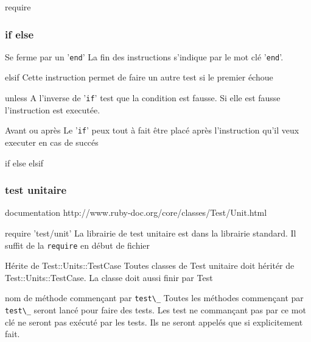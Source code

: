 \documentclass{beamer}
\begin{document}
\begin{frame}
  \begin{beamerboxesrounded}{require}
    
  \end{beamerboxesrounded}
\end{frame}


\begin{frame}
  \frametitle{if else}
  \begin{block}{Se ferme par un '\verb?end?'}
    La fin des instructions s'indique par le mot cl\'e '\verb?end?'.
  \end{block}
  \begin{block}{elsif}
    Cette instruction permet de faire un autre test si le premier \'echoue
  \end{block}
  \begin{block}{unless}
    A l'inverse de '\verb?if?' test que la condition est fausse. Si elle est fausse l'instruction est execut\'ee.
  \end{block}
  \begin{block}{Avant ou après}
      Le '\verb?if?' peux tout à fait être plac\'e après l'instruction qu'il veux executer en cas de succ\'es
  \end{block}
\end{frame}

\begin{frame}
  \begin{beamerboxesrounded}{if else elsif}
    
  \end{beamerboxesrounded}
\end{frame}

\begin{frame}
  \frametitle{test unitaire}
  \begin{block}{documentation}
    http://www.ruby-doc.org/core/classes/Test/Unit.html
  \end{block}
  \begin{block}{require 'test/unit'}
    La librairie de test unitaire est dans la librairie standard. Il suffit de la \verb?require? en d\'ebut de fichier
  \end{block}
  \begin{block}{H\'erite de Test::Units::TestCase}
    Toutes classes de Test unitaire doit h\'erit\'er de Test::Units::TestCase. La classe doit aussi finir par Test
  \end{block}
  \begin{block}{nom de m\'ethode commençant par \verb?test\_?}
    Toutes les m\'ethodes commençant par \verb?test\_? seront lanc\'e pour faire des tests. Les test ne commançant pas par ce mot cl\'e ne seront pas ex\'ecut\'e par les tests. Ils ne seront appel\'es que si explicitement fait.
  \end{block}
\end{frame}
\end{document}
